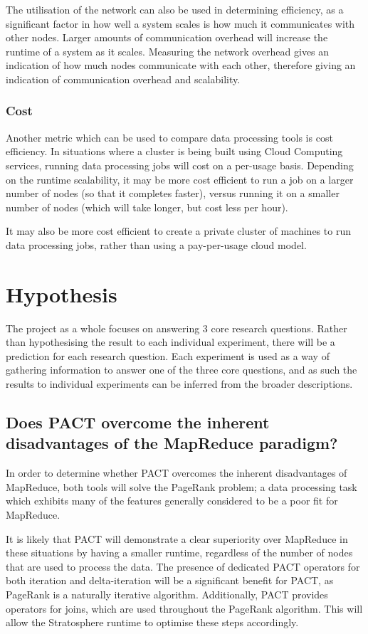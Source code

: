 The utilisation of the network can also be used in determining efficiency, as a significant factor in how well a system scales is how much it communicates with other nodes. Larger amounts of communication overhead will increase the runtime of a system as it scales. Measuring the network overhead gives an indication of how much nodes communicate with each other, therefore giving an indication of communication overhead and scalability.

\subsubsection{Cost}
Another metric which can be used to compare data processing tools is cost efficiency. In situations where a cluster is being built using Cloud Computing services, running data processing jobs will cost on a per-usage basis. Depending on the runtime scalability, it may be more cost efficient to run a job on a larger number of nodes (so that it completes faster), versus running it on a smaller number of nodes (which will take longer, but cost less per hour). 

It may also be more cost efficient to create a private cluster of machines to run data processing jobs, rather than using a pay-per-usage cloud model.

\section{Hypothesis}
The project as a whole focuses on answering 3 core research questions. Rather than hypothesising the result to each individual experiment, there will be a prediction for each research question. Each experiment is used as a way of gathering information to answer one of the three core questions, and as such the results to individual experiments can be inferred from the broader descriptions.

\tocless\subsection{Does PACT overcome the inherent disadvantages of the MapReduce paradigm?}
In order to determine whether PACT overcomes the inherent disadvantages of MapReduce, both tools will solve the PageRank problem; a data processing task which exhibits many of the features generally considered to be a poor fit for MapReduce.

It is likely that PACT will demonstrate a clear superiority over MapReduce in these situations by having a smaller runtime, regardless of the number of nodes that are used to process the data. The presence of dedicated PACT operators for both iteration and delta-iteration will be a significant benefit for PACT, as PageRank is a naturally iterative algorithm. Additionally, PACT provides operators for joins, which are used throughout the PageRank algorithm. This will allow the Stratosphere runtime to optimise these steps accordingly.

